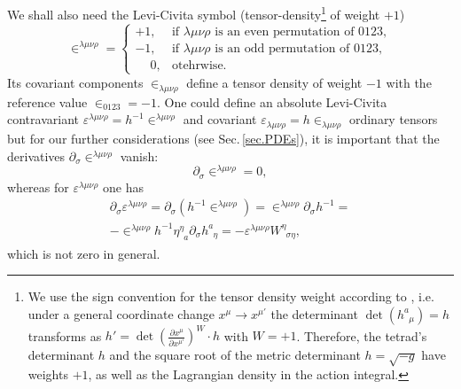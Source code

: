 \documentclass[
10pt, %
a4paper, %
oneside, %
twocolumn,
headinclude,footinclude, %
BCOR5mm, %
]{scrartcl}
\newcommand{\pd}[1]{\partial_{#1}}
\newcommand{\tetrsymbol}{h}
\newcommand{\itetrsymbol}{\eta}
\newcommand{\itetr}[2]{\itetrsymbol^{#1}_{\phantom{#1}#2}}
\newcommand{\tetr}[2]{\tetrsymbol^{#1}_{\phantom{#1}#2}}
\newcommand{\detTetr}{\tetrsymbol}
\newcommand{\D}[1]{\partial_{#1}} %
\newcommand{\w}[2]{W^{#1}_{\phantom{#1}#2}}
\newcommand{\LCsymb}{\bm{\in}}    %
\newcommand{\LCtens}{\varepsilon} %
\begin{document}
	
	We shall also need the Levi-Civita symbol (tensor-density\footnote{We 
		use the 
		sign convention for the tensor density weight according to \cite{Ryder2009,Grinfeld2013}, 
		i.e.
		under a 
		general 
		coordinate change $ x^\mu \to x^{\mu'} $ the determinant $ \det(\tetr{a}{\mu}) = \detTetr $ 
		transforms as $ \detTetr' = \det \left(\frac{\partial x^\mu}{\partial x^{\mu'}} \right)^W 
		\cdot \detTetr $ with $ W=+1 $. Therefore, the tetrad's determinant $ \detTetr $ and the 
		square root of the metric determinant $ \detTetr = \sqrt{-g} $ have weights $ +1 $, as well 
		as 
		the Lagrangian density in the action integral.} of weight $ +1 $)
	\begin{equation}\label{eqn.LCsymbol.def}
		\LCsymb^{\lambda\mu\nu\rho} = 
		\left\{ 
		\begin{array}{ll}
			+1,	& \text{if \ }\lambda\mu\nu\rho \text{ is an even permutation of } 0123,\\[2mm]
			-1,	& \text{if \ }\lambda\mu\nu\rho \text{ is an odd \ permutation of } 0123,\\[2mm]
			\phantom{-}0,	& \text{otehrwise}.
		\end{array}
		\right.
	\end{equation}
	Its covariant components $ \LCsymb_{\lambda\mu\nu\rho} $ define a tensor density of weight $ -1 
	$ 
	with the reference value $ \LCsymb_{0123} = -1 $. One could define an absolute 
	Levi-Civita 
	contravariant $ \LCtens^{\lambda\mu\nu\rho} = h^{-1} \LCsymb^{\lambda\mu\nu\rho} $ 
	and covariant $ \LCtens_{\lambda\mu\nu\rho} = h \LCsymb_{\lambda\mu\nu\rho} $ ordinary tensors  
	but for our further considerations (see Sec.\,\ref{sec.PDEs}), it is important that 
	the derivatives $ \D{\sigma}\LCsymb^{\lambda\mu\nu\rho} $ vanish:
	\begin{equation}\label{eqn.diff.LCsymb}
		\D{\sigma}\LCsymb^{\lambda\mu\nu\rho} = 0,
	\end{equation}
	whereas for $ \LCtens^{\lambda\mu\nu\rho} $ one has
	\begin{multline}\label{eqn.diff.LeviCivita}
		\D{\sigma}\LCtens^{\lambda\mu\nu\rho} = 
		\pd{\sigma}(\detTetr^{-1}\LCsymb^{\lambda\mu\nu\rho}) = 
		\LCsymb^{\lambda\mu\nu\rho}\pd{\sigma}\detTetr^{-1}   = \\[2mm] 
		-\LCsymb^{\lambda\mu\nu\rho}\detTetr^{-1}\itetr{\eta}{a}\pd{\sigma}\tetr{a}{\eta} = 
		-\LCtens^{\lambda\mu\nu\rho}\w{\eta}{\sigma\eta},
	\end{multline}
	which is not zero in general.
	
\end{document}
